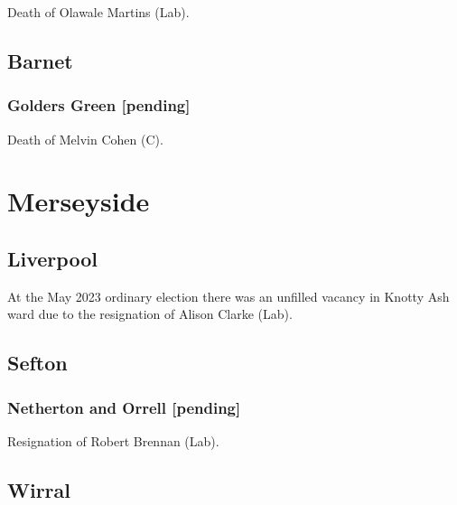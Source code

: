 \documentclass[a4paper,openany]{book}
\begin{document}
\begin{resultsiii}

Death of Olawale Martins (Lab).

\subsection*{Barnet}

\subsubsection*{Golders Green \hspace*{\fill}\nolinebreak[1]%
	\enspace\hspace*{\fill}
	[pending]}


Death of Melvin Cohen (C).

\section{Merseyside}

\subsection*{Liverpool}

At the May 2023 ordinary election there was an unfilled vacancy in Knotty Ash ward due to the resignation of Alison Clarke (Lab).%

\subsection*{Sefton}

\subsubsection*{Netherton and Orrell \hspace*{\fill}\nolinebreak[1]%
	\enspace\hspace*{\fill}
	[pending]}


Resignation of Robert Brennan (Lab).

\subsection*{Wirral}


\end{resultsiii}
\end{document}
